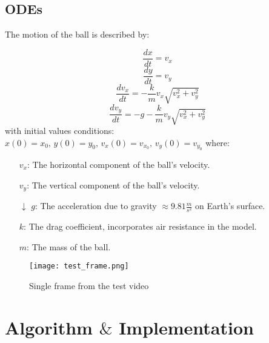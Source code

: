 \documentclass{article}
\begin{document}
	\subsection{ODEs}

	The motion of the ball is described by:
	
	$$\frac{dx}{dt} = v_x$$
	$$\frac{dy}{dt} = v_y$$
	$$\frac{dv_x}{dt} = - \frac{k}{m} v_x \sqrt{v_x^2 + v_y^2}$$
	$$\frac{dv_y}{dt} = -g - \frac{k}{m} v_y \sqrt{v_x^2 + v_y^2}$$
	with initial values conditions: $x(0) = x_0, \, y(0) = y_0, \, v_x(0) = v_{x_0}, \, v_y(0) = v_{y_0}$ where:
	\begin{itemize}
		\item[\ding{214}] $v_x$: The horizontal component of the ball’s velocity.
		\item[\ding{215}] $v_y$: The vertical component of the ball’s velocity.
		\item[$\downarrow$] $g$: The acceleration due to gravity $\approx 9.81 \frac{m}{s^2}$ on Earth’s surface.
		\item[\ding{223}] $k$: The drag coefficient, incorporates air resistance in the model.
		\item[\ding{109}] $m$: The mass of the ball.
	\end{itemize}

	\begin{figure}[H]
		\centering
		\texttt{[image: test\_frame.png]}
		\caption{Single frame from the test video}
	\end{figure}

	\section{Algorithm $\&$ Implementation}
	
\end{document}
